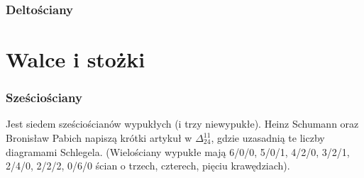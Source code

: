 \subsubsection{Deltościany}
\section{Walce i stożki}

\subsubsection{Sześciościany}
Jest siedem sześciościanów wypukłych (i trzy niewypukłe).
Heinz Schumann oraz Bronisław Pabich napiszą krótki artykuł w $\Delta_{24}^{11}$, gdzie uzasadnią te liczby diagramami Schlegela.
%
(Wielościany wypukłe mają 6/0/0, 5/0/1, 4/2/0, 3/2/1, 2/4/0, 2/2/2, 0/6/0 ścian o trzech, czterech, pięciu krawędziach).

